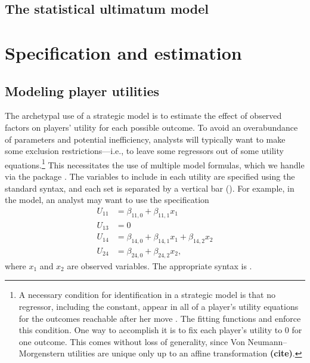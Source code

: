 \documentclass[article]{jss}
\begin{document}
\subsection{The statistical ultimatum model}


\section{Specification and estimation}


\subsection{Modeling player utilities}

The archetypal use of a strategic model is to estimate the effect of observed
factors on players' utility for each possible outcome.  To avoid
an overabundance of parameters and potential inefficiency, analysts will
typically want to make some exclusion restrictions---i.e., to leave some
regressors out of some utility equations.\footnote{A necessary condition for
  identification in a strategic model is that no regressor, including the
  constant, appear in all of a player's utility equations for the outcomes
  reachable after her move \citep{Lewis2003}.  The fitting functions and
   enforce this condition.  One way to accomplish it is to
  fix each player's utility to $0$ for one outcome.  This comes without loss of
  generality, since Von Neumann--Morgenstern utilities are unique only up to an
  affine transformation \textbf{(cite)}.}  This necessitates the use of multiple
model formulas, which we handle via the  package
\citep{Formulapkg}.  The variables to include in each utility are specified
using the standard  syntax, and each set is separated by a
vertical bar (\code{|}).  For example, in the  model, an analyst
may want to use the specification
\begin{align*}
  U_{11} &= \beta_{11,0} + \beta_{11,1} x_1 \\
  U_{13} &= 0 \\
  U_{14} &= \beta_{14,0} + \beta_{14,1} x_1 + \beta_{14,2} x_2 \\
  U_{24} &= \beta_{24,0} + \beta_{24,2} x_2,
\end{align*}
where $x_1$ and $x_2$ are observed variables.  The appropriate 
syntax is .
\end{document}
